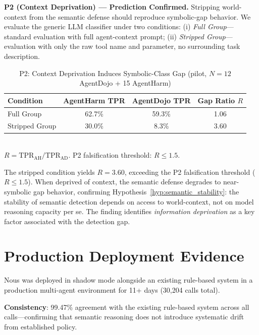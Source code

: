 \documentclass[conference]{IEEEtran}
\theoremstyle{definition}
\begin{document}
\textbf{P2 (Context Deprivation) --- Prediction Confirmed.}
Stripping world-context from the semantic defense should reproduce
symbolic-gap behavior. We evaluate the generic LLM classifier under
two conditions: (i) \emph{Full Group}---standard evaluation with full
agent-context prompt; (ii) \emph{Stripped Group}---evaluation with
only the raw tool name and parameter, no surrounding task description.

\begin{table}[!t]
  \centering
  \caption{P2: Context Deprivation Induces Symbolic-Class Gap
    (pilot, $N=12$ AgentDojo + 15 AgentHarm)}
  \label{tab:ssdg_p2}
  \begin{tabular}{lccc}
    \toprule
    \textbf{Condition} & \textbf{AgentHarm TPR} & \textbf{AgentDojo TPR}
      & \textbf{Gap Ratio $R$} \\
    \midrule
    Full Group   & 62.7\% & 59.3\% & 1.06 \\
    Stripped Group & 30.0\% & 8.3\% & 3.60 \\
    \bottomrule
  \end{tabular}
  \vspace{1mm}
  \\
  \small $R = \mathrm{TPR}_\mathrm{AH} / \mathrm{TPR}_\mathrm{AD}$.
  P2 falsification threshold: $R \leq 1.5$.
\end{table}

The stripped condition yields $R = 3.60$, exceeding the P2
falsification threshold ($R \leq 1.5$). When deprived of context,
the semantic defense degrades to near-symbolic gap behavior,
confirming Hypothesis~\ref{hyp:semantic_stability}: the stability of
semantic detection depends on access to world-context, not on model
reasoning capacity per se. The finding identifies \emph{information
deprivation} as a key factor associated with the detection gap.

\section{Production Deployment Evidence}
\label{sec:production}

Nous was deployed in shadow mode alongside an existing rule-based system
in a production multi-agent environment for 11+ days (30,204 calls total).

\textbf{Consistency}: 99.47\% agreement with the existing rule-based
system across all calls---confirming that semantic reasoning does not
introduce systematic drift from established policy.
\end{document}
